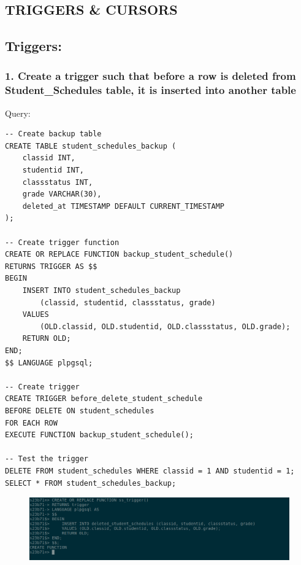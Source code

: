 \documentclass{article}
\begin{document}
\subsection*{TRIGGERS \& CURSORS}

\subsection*{Triggers:}

\subsubsection*{1. Create a trigger such that before a row is deleted from Student\_Schedules table, it is inserted into another table}
Query:
\begin{Verbatim}[frame=single,framerule=1pt,fontfamily=courier,fontsize=\small]
-- Create backup table
CREATE TABLE student_schedules_backup (
    classid INT,
    studentid INT,
    classstatus INT,
    grade VARCHAR(30),
    deleted_at TIMESTAMP DEFAULT CURRENT_TIMESTAMP
);

-- Create trigger function
CREATE OR REPLACE FUNCTION backup_student_schedule()
RETURNS TRIGGER AS $$
BEGIN
    INSERT INTO student_schedules_backup 
        (classid, studentid, classstatus, grade)
    VALUES 
        (OLD.classid, OLD.studentid, OLD.classstatus, OLD.grade);
    RETURN OLD;
END;
$$ LANGUAGE plpgsql;

-- Create trigger
CREATE TRIGGER before_delete_student_schedule
BEFORE DELETE ON student_schedules
FOR EACH ROW
EXECUTE FUNCTION backup_student_schedule();

-- Test the trigger
DELETE FROM student_schedules WHERE classid = 1 AND studentid = 1;
SELECT * FROM student_schedules_backup;
\end{Verbatim}
\begin{figure}[H]
    \centering
    \includegraphics[width=\textwidth]{cycle6/6-1.png}
\end{figure}
\end{document}
